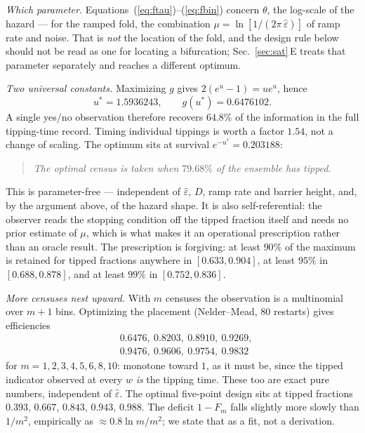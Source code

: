 \documentclass[%
 aip,
 cha,
 amsmath,amssymb,
 reprint,
 superscriptaddress,
 floatfix,
]{revtex4-2}
\newcommand{\Sig}{\hat\varepsilon}
\begin{document}
\emph{Which parameter.}  Equations~(\ref{eq:ftau})--(\ref{eq:fbin}) concern $\theta$, the log-scale of the hazard --- for the ramped fold, the combination $\mu=\ln[1/(2\pi\,\Sig)]$ of ramp rate and noise.  That is \emph{not} the location of the fold, and the design rule below should not be read as one for locating a bifurcation; Sec.~\ref{sec:sat}\,E treats that parameter separately and reaches a different optimum.

\emph{Two universal constants.}  Maximizing $g$ gives $2(e^u-1)=u e^u$, hence
\begin{equation}
\label{eq:ustar}
u^\ast=1.5936243,\qquad g(u^\ast)=0.6476102 .
\end{equation}
A single yes/no observation therefore recovers $64.8\%$ of the information in the full tipping-time record.  Timing individual tippings is worth a factor $1.54$, not a change of scaling.  The optimum sits at survival $e^{-u^\ast}=0.203188$:

\begin{quote}
\emph{The optimal census is taken when $79.68\%$ of the ensemble has tipped.}
\end{quote}

\noindent This is parameter-free --- independent of $\Sig$, $D$, ramp rate and barrier height, and, by the argument above, of the hazard shape.  It is also self-referential: the observer reads the stopping condition off the tipped fraction itself and needs no prior estimate of $\mu$, which is what makes it an operational prescription rather than an oracle result.  The prescription is forgiving: at least $90\%$ of the maximum is retained for tipped fractions anywhere in $[0.633,0.904]$, at least $95\%$ in $[0.688,0.878]$, and at least $99\%$ in $[0.752,0.836]$.

\emph{More censuses nest upward.}  With $m$ censuses the observation is a multinomial over $m+1$ bins.  Optimizing the placement (Nelder--Mead, $80$ restarts) gives efficiencies
\begin{equation}
\label{eq:nesting}
\begin{aligned}
&0.6476,\ 0.8203,\ 0.8910,\ 0.9269,\\
&0.9476,\ 0.9606,\ 0.9754,\ 0.9832
\end{aligned}
\end{equation}
for $m=1,2,3,4,5,6,8,10$: monotone toward $1$, as it must be, since the tipped indicator observed at every $w$ \emph{is} the tipping time.  These too are exact pure numbers, independent of $\Sig$.  The optimal five-point design sits at tipped fractions $0.393$, $0.667$, $0.843$, $0.943$, $0.988$.  The deficit $1-F_m$ falls slightly more slowly than $1/m^2$, empirically as ${\approx}0.8\ln m/m^2$; we state that as a fit, not a derivation.
\end{document}
